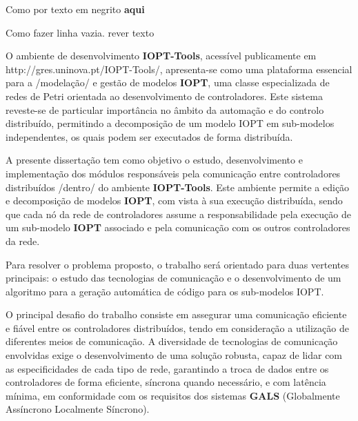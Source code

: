 
%



Como por texto em negrito \textbf{aqui} 

%
Como fazer linha vazia. rever texto





O ambiente de desenvolvimento \textbf{IOPT-Tools}, acessível publicamente em http://gres.uninova.pt/IOPT-Tools/, apresenta-se como uma plataforma essencial para a /modelação/ e gestão de modelos \textbf{ IOPT}, uma classe especializada de redes de Petri orientada ao desenvolvimento de controladores. Este sistema reveste-se de particular importância no âmbito da automação e do controlo distribuído, permitindo a decomposição de um modelo IOPT em sub-modelos independentes, os quais podem ser executados de forma distribuída.

A presente dissertação tem como objetivo o estudo, desenvolvimento e implementação dos módulos responsáveis pela comunicação entre controladores distribuídos /dentro/ do ambiente \textbf{IOPT-Tools}. Este ambiente permite a edição e decomposição de modelos \textbf{IOPT}, com vista à sua execução distribuída, sendo que cada nó da rede de controladores assume a responsabilidade pela execução de um sub-modelo \textbf{IOPT} associado e pela comunicação com os outros controladores da rede.

Para resolver o problema proposto, o trabalho será orientado para duas vertentes principais: o estudo das tecnologias de comunicação e o desenvolvimento de um algoritmo para a geração automática de código para os sub-modelos IOPT.

O principal desafio do trabalho consiste em assegurar uma comunicação eficiente e fiável entre os controladores distribuídos, tendo em consideração a utilização de diferentes meios de comunicação. A diversidade de tecnologias de comunicação envolvidas exige o desenvolvimento de uma solução robusta, capaz de lidar com as especificidades de cada tipo de rede, garantindo a troca de dados entre os controladores de forma eficiente, síncrona quando necessário, e com latência mínima, em conformidade com os requisitos dos sistemas \textbf{GALS} (Globalmente Assíncrono Localmente Síncrono).

